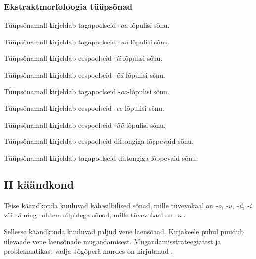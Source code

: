 \documentclass[12pt,a4paper]{article}
\newcommand{\vadja}[1]{\textit{#1}}
\begin{document}
\subsubsection*{Ekstraktmorfoloogia tüüpsõnad}


\vspace{-3.5em}

Tüüpsõna\-mall kirjeldab tagapoolseid -\textit{aa}-lõpulisi sõnu.

Tüüpsõna\-mall kirjeldab tagapoolseid -\textit{uu}-lõpulisi sõnu.

Tüüpsõna\-mall kirjeldab eespoolseid -\textit{ii}-lõpulisi sõnu.

Tüüpsõna\-mall kirjeldab eespoolseid -\textit{ää}-lõpulisi sõnu.

Tüüpsõna\-mall kirjeldab tagapoolseid -\textit{oo}-lõpulisi sõnu.

Tüüpsõna\-mall kirjeldab eespoolseid -\textit{ee}-lõpulisi sõnu.

Tüüpsõna\-mall kirjeldab eespoolseid -\textit{üü}-lõpulisi sõnu.

Tüüpsõna\-mall kirjeldab eespoolseid diftongiga lõppevaid sõnu.

Tüüpsõna\-mall kirjeldab tagapoolseid diftongiga lõppevaid sõnu.


\subsection{\RN{2} käändkond}

Teise käändkonda kuuluvad kahesilbilised sõnad, mille tüvevokaal on \vadja{-o}, \vadja{-u}, \vadja{-ü}, \vadja{-i} või \vadja{-õ} ning rohkem silpidega sõnad, mille tüvevokaal on \vadja{-o} \cite[42]{ariste_grammar_1968}.

Sellesse käändkonda kuuluvad paljud vene laensõnad. Kirja\-keele puhul puudub ülevaade vene laensõnade mugandamisest. Mugandamis\-strateegiatest ja problemaatikast vadja Jõgõperä murdes on kirjutanud \cite{rozhanskiy_zaimstvovannyje_2009}.
\end{document}
